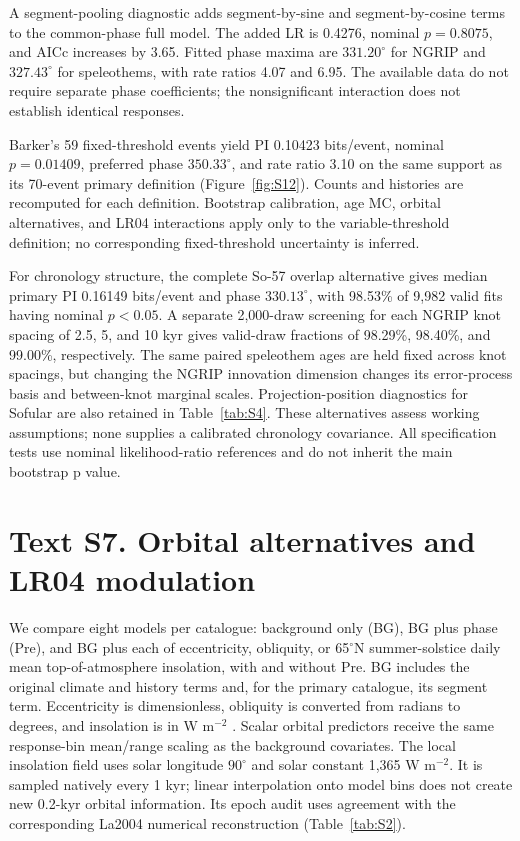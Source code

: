 \documentclass[11pt]{article}
\begin{document}
A segment-pooling diagnostic adds segment-by-sine and segment-by-cosine terms to the common-phase full model. The added LR is 0.4276, nominal $p=0.8075$, and AICc increases by 3.65. Fitted phase maxima are $331.20^\circ$ for NGRIP and $327.43^\circ$ for speleothems, with rate ratios 4.07 and 6.95. The available data do not require separate phase coefficients; the nonsignificant interaction does not establish identical responses.

Barker's 59 fixed-threshold events yield PI 0.10423 bits/event, nominal $p=0.01409$, preferred phase $350.33^\circ$, and rate ratio 3.10 on the same support as its 70-event primary definition (Figure~\ref{fig:S12}). Counts and histories are recomputed for each definition. Bootstrap calibration, age MC, orbital alternatives, and LR04 interactions apply only to the variable-threshold definition; no corresponding fixed-threshold uncertainty is inferred.

For chronology structure, the complete So-57 overlap alternative gives median primary PI 0.16149 bits/event and phase $330.13^\circ$, with 98.53\% of 9,982 valid fits having nominal $p<0.05$. A separate 2,000-draw screening for each NGRIP knot spacing of 2.5, 5, and 10 kyr gives valid-draw fractions of 98.29\%, 98.40\%, and 99.00\%, respectively. The same paired speleothem ages are held fixed across knot spacings, but changing the NGRIP innovation dimension changes its error-process basis and between-knot marginal scales. Projection-position diagnostics for Sofular are also retained in Table~\ref{tab:S4}. These alternatives assess working assumptions; none supplies a calibrated chronology covariance. All specification tests use nominal likelihood-ratio references and do not inherit the main bootstrap p value.

\section*{Text S7. Orbital alternatives and LR04 modulation}

We compare eight models per catalogue: background only (BG), BG plus phase (Pre), and BG plus each of eccentricity, obliquity, or 65$^\circ$N summer-solstice daily mean top-of-atmosphere insolation, with and without Pre. BG includes the original climate and history terms and, for the primary catalogue, its segment term. Eccentricity is dimensionless, obliquity is converted from radians to degrees, and insolation is in W m$^{-2}$ \citep{laskar2004long}. Scalar orbital predictors receive the same response-bin mean/range scaling as the background covariates. The local insolation field uses solar longitude $90^\circ$ and solar constant 1,365 W m$^{-2}$. It is sampled natively every 1 kyr; linear interpolation onto model bins does not create new 0.2-kyr orbital information. Its epoch audit uses agreement with the corresponding La2004 numerical reconstruction (Table~\ref{tab:S2}).
\end{document}
